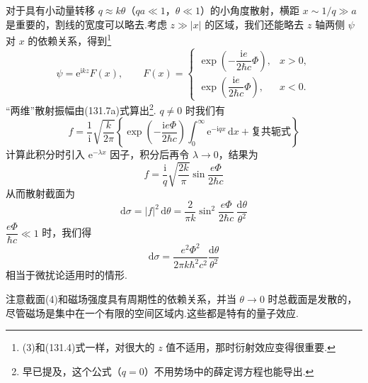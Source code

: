 \begin{xiti}
对于具有小动量转移 $q\approx k\theta$（$qa\ll1$，$\theta\ll1$）的小角度散射，横距 $x\sim1/q\gg a$ 是重要的，割线的宽度可以略去.考虑 $z\gg|x|$ 的区域，我们还能略去 $z$ 轴两侧 $\psi$ 对 $x$ 的依赖关系，得到\footnote{(3)和(131.4)式一样，对很大的 $z$ 值不适用，那时衍射效应变得很重要.}
\begin{equation}
  \psi=\mathrm{e}^{\mathrm{i}kz}F(x),\qquad
  F(x)=\left\{
  \begin{array}{ll}
    \exp\left(-\dfrac{\mathrm{i}e}{2\hbar c}\Phi\right), & x>0,\\[1em]
    \exp\left(\dfrac{\mathrm{i}e}{2\hbar c}\Phi\right), & x<0.
  \end{array}\right.
\end{equation}
“两维”散射振幅由(131.7a)式算出\footnote{早已提及，这个公式（$q=0$）不用势场中的薛定谔方程也能导出.}. $q\neq0$ 时我们有
\begin{equation*}
  f=\frac{1}{\mathrm{i}}\sqrt{\frac{k}{2\pi}}
  \left\{\exp\left(-\frac{\mathrm{i}e\Phi}{2\hbar c}\right)
  \int_0^{\infty}\mathrm{e}^{-\mathrm{i}qx}\,\mathrm{d}x
  +\text{复共轭式}\right\}
\end{equation*}
计算此积分时引入 $\mathrm{e}^{-\lambda x}$ 因子，积分后再令 $\lambda\to0$，结果为
\begin{equation*}
  f=\frac{\mathrm{i}}{q}\sqrt{\frac{2k}{\pi}}
  \sin\frac{e\Phi}{2\hbar c}
\end{equation*}
从而散射截面为
\begin{equation}
  \mathrm{d}\sigma=|f|^2\,\mathrm{d}\theta
  =\frac{2}{\pi k}\sin^2\frac{e\Phi}{2\hbar c}\,
  \frac{\mathrm{d}\theta}{\theta^2}
\end{equation}
$\dfrac{e\Phi}{\hbar c}\ll1$ 时，我们得
\begin{equation*}
  \mathrm{d}\sigma=\frac{e^2\Phi^2}{2\pi k\hbar^2c^2}
  \frac{\mathrm{d}\theta}{\theta^2}
\end{equation*}
相当于微扰论适用时的情形.

注意截面(4)和磁场强度具有周期性的依赖关系，并当 $\theta\to0$ 时总截面是发散的，尽管磁场是集中在一个有限的空间区域内.这些都是特有的量子效应.

\end{xiti}
\setcounter{equation}{0}%
